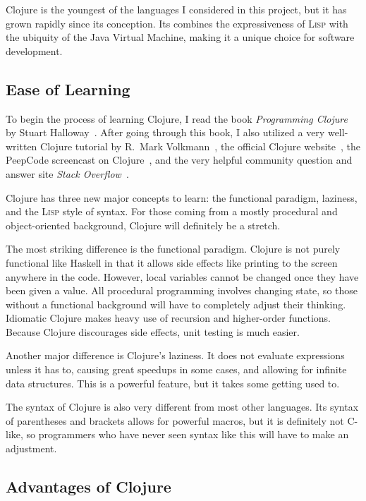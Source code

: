 \documentclass{article}
\begin{document}
Clojure is the youngest of the languages I considered in this project, but it
has grown rapidly since its conception.  Its combines the expressiveness of
\textsc{Lisp} with the ubiquity of the Java Virtual Machine, making it a unique
choice for software development.

\subsection{Ease of Learning}

To begin the process of learning Clojure, I read the book \emph{Programming
Clojure} by Stuart Halloway~\cite{clojurebook}.  After going through this book,
I also utilized a very well-written Clojure tutorial by R.~Mark
Volkmann~\cite{clojuretutorial}, the official Clojure
website~\cite{clojuredotorg}, the PeepCode screencast on
Clojure~\cite{peepcodeclojure}, and the very helpful community question and answer
site \emph{Stack Overflow}~\cite{stackoverflow}.

Clojure has three new major concepts to learn: the functional paradigm,
laziness, and the \textsc{Lisp} style of syntax. For those coming from a mostly
procedural and object-oriented background, Clojure will definitely be a stretch.

The most striking difference is the functional paradigm.  Clojure is not purely
functional like Haskell in that it allows side effects like printing to the
screen anywhere in the code.  However, local variables cannot be changed once
they have been given a value.  All procedural programming involves changing
state, so those without a functional background will have to completely adjust
their thinking.  Idiomatic Clojure makes heavy use of recursion and higher-order
functions.  Because Clojure discourages side effects, unit testing is much
easier.

Another major difference is Clojure's laziness.  It does not evaluate
expressions unless it has to, causing great speedups in some cases, and allowing
for infinite data structures.  This is a powerful feature, but it takes some
getting used to.  

The syntax of Clojure is also very different from most other languages.  Its
syntax of parentheses and brackets allows for powerful macros, but it is
definitely not C-like, so programmers who have never seen syntax like this will
have to make an adjustment.

\subsection{Advantages of Clojure}
\end{document}
